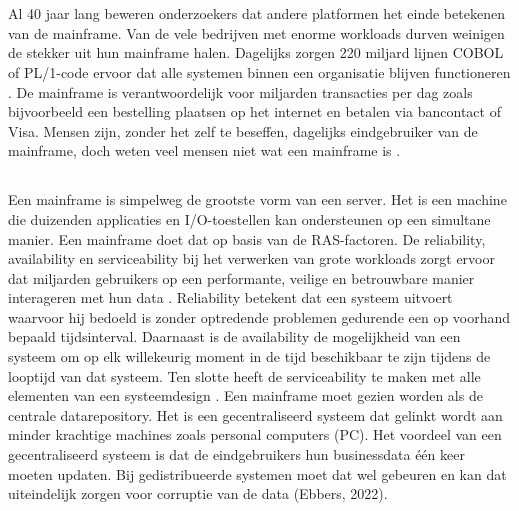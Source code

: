 
\chapter{}
\label{ch:inleiding}
Al 40 jaar lang beweren onderzoekers dat andere platformen het einde betekenen van de mainframe. Van de vele bedrijven met enorme workloads durven weinigen de stekker uit hun mainframe halen. Dagelijks zorgen 220 miljard lijnen COBOL of PL/1-code ervoor dat alle systemen binnen een organisatie blijven functioneren \autocite{Scannell2017}. De mainframe is verantwoordelijk voor miljarden transacties per dag zoals bijvoorbeeld een bestelling plaatsen op het internet en betalen via bancontact of Visa. Mensen zijn, zonder het zelf te beseffen, dagelijks eindgebruiker van de mainframe, doch weten veel mensen niet wat een mainframe is \autocite{Scannell2017}. 


\section{}

Een mainframe is simpelweg de grootste vorm van een server. Het is een machine die duizenden applicaties en I/O-toestellen kan ondersteunen op een simultane manier. Een mainframe doet dat op basis van de RAS-factoren. De reliability, availability en serviceability bij het verwerken van grote workloads zorgt ervoor dat miljarden gebruikers op een performante, veilige en betrouwbare manier interageren met hun data \autocite{Ebbers2022}. Reliability betekent dat een systeem uitvoert waarvoor hij bedoeld is zonder optredende problemen gedurende een op voorhand bepaald tijdsinterval. Daarnaast is de availability de mogelijkheid van een systeem om op elk willekeurig moment in de tijd beschikbaar te zijn tijdens de looptijd van dat systeem. Ten slotte heeft de serviceability te maken met alle elementen van een systeemdesign \autocite{Johnson1988}. Een mainframe moet gezien worden als de centrale datarepository. Het is een gecentraliseerd systeem dat gelinkt wordt aan minder krachtige machines zoals personal computers (PC). Het voordeel van een gecentraliseerd systeem is dat de eindgebruikers hun businessdata één keer moeten updaten. Bij gedistribueerde systemen moet dat wel gebeuren en kan dat uiteindelijk zorgen voor
corruptie van de data (Ebbers, 2022).

